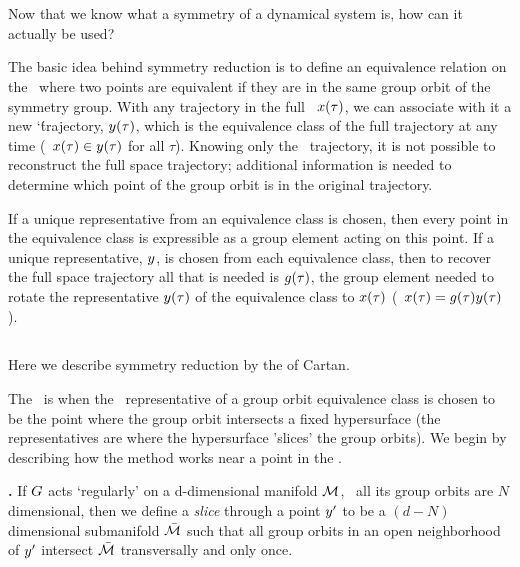 {    \fi

\section{\Reducedsp}
\label{sect:reducedStateSp}

Now that we know what a symmetry of a dynamical system is, how can it actually be used?

The basic idea behind symmetry reduction is to define an equivalence relation on the \statesp\ where two points are equivalent if they are in the same group orbit of the symmetry group. With any trajectory in the full \statesp\, $x(\tau)$, we can associate with it a new `\reducedsp\' trajectory, $y(\tau)$, which is the equivalence class of the full trajectory at any time (\ie\ $x(\tau) \in y(\tau)$ for all $\tau$). Knowing only the \reducedsp\ trajectory, it is not possible to reconstruct the full space trajectory; additional information is needed to determine which point of the group orbit is in the original trajectory.

If a unique representative from an equivalence class is chosen, then every point in the equivalence class is expressible as a group element acting on this point. If a unique representative, $y$, is chosen from each equivalence class, then to recover the full space trajectory all that is needed is $g(\tau)$, the group element needed to rotate the representative $y(\tau)$ of the equivalence class to $x(\tau)$ (\ie\ $x(\tau)=g(\tau) y(\tau)$).


\subsection{\Mslices}
\label{sect:mslices}


Here we describe symmetry reduction by the
{\em {\mslices}} of
Cartan.

The \mslices\ is when the \reducedsp\ representative of a group orbit equivalence class is chosen to be the point where the group orbit intersects a fixed hypersurface (the representatives are where the hypersurface 'slices' the group orbits). We begin by describing how the method works near a point in the \statesp.

\begin{definition}
\textbf{\Slice.}
If $G$ acts `regularly' on a d-dimensional manifold ${\cal M}$, \ie\ all its group orbits are $N$ dimensional, then we define a \emph{slice}  through a point ${y'}$ to be a $(d\!-\!N)$ dimensional submanifold $\bar{\cal M}$ such that all group orbits in an open neighborhood of ${y'}$ intersect $\bar{\cal M}$ transversally and only once.
\end{definition}

}
